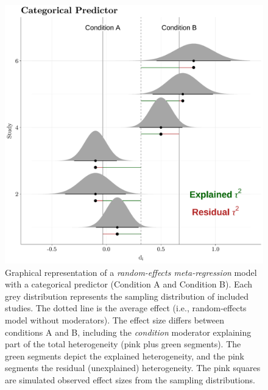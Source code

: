 \documentclass[
  man,floatsintext]{apa6}
\begin{document}
\begin{figure}[H]

{\centering \includegraphics[width=0.8\linewidth]{paper_files/figure-latex/img-metaregression-bin-1} 

}

\caption{Graphical representation of a \emph{random-effects meta-regression} model with a categorical predictor (Condition A and Condition B). Each grey distribution represents the sampling distribution of included studies. The dotted line is the average effect (i.e., random-effects model without moderators). The effect size differs between conditions A and B, including the \emph{condition} moderator explaining part of the total heterogeneity (pink plus green segments). The green segments depict the explained heterogeneity, and the pink segments the residual (unexplained) heterogeneity. The pink squares are simulated observed effect sizes from the sampling distributions.}\label{fig:img-metaregression-bin}
\end{figure}

\normalsize

\scriptsize
\end{document}
